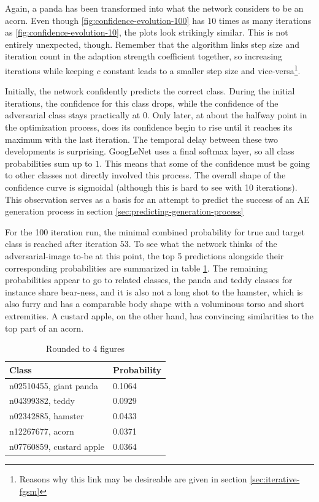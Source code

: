\documentclass[11pt, a4paper]{article}
\begin{document}
Again, a panda has been transformed into what the network considers to be an acorn. Even though \ref{fig:confidence-evolution-100} has $10$ times as many iterations as \ref{fig:confidence-evolution-10}, the plots look strikingly similar. This is not entirely unexpected, though. Remember that the algorithm links step size and iteration count in the adaption strength coefficient together, so increasing iterations while keeping $c$ constant leads to a smaller step size and vice-versa\footnote{Reasons why this link may be desireable are given in section \ref{sec:iterative-fgsm}}.

Initially, the network confidently predicts the correct class. During the initial iterations, the confidence for this class drops, while the confidence of the adversarial class stays practically at $0$. Only later, at about the halfway point in the optimization process, does its confidence begin to rise until it reaches its maximum with the last iteration. The temporal delay between these two developments is surprising. GoogLeNet uses a final softmax layer, so all class probabilities sum up to $1$. This means that some of the confidence must be going to other classes not directly involved this process. The overall shape of the confidence curve is sigmoidal (although this is hard to see with 10 iterations). This observation serves as a basis for an attempt to predict the success of an AE generation process in section \ref{sec:predicting-generation-process}

For the 100 iteration run, the minimal combined probability for true and target class is reached after iteration $53$. To see what the network thinks of the adversarial-image to-be at this point, the top 5 predictions alongside their corresponding probabilities are summarized in table \ref{tab:ae-intermediate}. The remaining probabilities appear to go to related classes, the panda and teddy classes for instance share bear-ness, and it is also not a long shot to the hamster, which is also furry and has a comparable body shape with a voluminous torso and short extremities. A custard apple, on the other hand, has convincing similarities to the top part of an acorn.

\begin{table}[htb]
	\centering
	\begin{tabular}{|l|l|}
		\hline
		Class & Probability \\
		\hline
		n02510455, giant panda & 0.1064 \\
		n04399382, teddy & 0.0929 \\
		n02342885, hamster & 0.0433 \\
		n12267677, acorn & 0.0371 \\
		n07760859, custard apple & 0.0364 \\
		\hline
	\end{tabular}
	\caption{Rounded to 4 figures}
	\label{tab:ae-intermediate}
\end{table}
\end{document}
